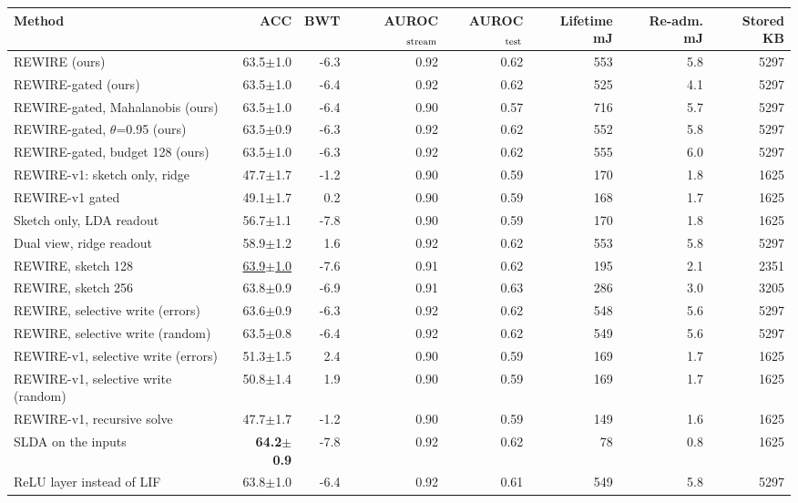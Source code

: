 \begin{tabular}{lrrrrrrr}
\toprule
Method & ACC & BWT & AUROC$_{\rm stream}$ & AUROC$_{\rm test}$ & Lifetime mJ & Re-adm. mJ & Stored KB \\
\midrule
REWIRE (ours) & 63.5{\tiny$\pm$1.0} & -6.3 & 0.92 & 0.62 & 553 & 5.8 & 5297 \\
REWIRE-gated (ours) & 63.5{\tiny$\pm$1.0} & -6.4 & 0.92 & 0.62 & 525 & 4.1 & 5297 \\
REWIRE-gated, Mahalanobis (ours) & 63.5{\tiny$\pm$1.0} & -6.4 & 0.90 & 0.57 & 716 & 5.7 & 5297 \\
REWIRE-gated, $\theta$=0.95 (ours) & 63.5{\tiny$\pm$0.9} & -6.3 & 0.92 & 0.62 & 552 & 5.8 & 5297 \\
REWIRE-gated, budget 128 (ours) & 63.5{\tiny$\pm$1.0} & -6.3 & 0.92 & 0.62 & 555 & 6.0 & 5297 \\
REWIRE-v1: sketch only, ridge & 47.7{\tiny$\pm$1.7} & -1.2 & 0.90 & 0.59 & 170 & 1.8 & 1625 \\
REWIRE-v1 gated & 49.1{\tiny$\pm$1.7} & 0.2 & 0.90 & 0.59 & 168 & 1.7 & 1625 \\
Sketch only, LDA readout & 56.7{\tiny$\pm$1.1} & -7.8 & 0.90 & 0.59 & 170 & 1.8 & 1625 \\
Dual view, ridge readout & 58.9{\tiny$\pm$1.2} & 1.6 & 0.92 & 0.62 & 553 & 5.8 & 5297 \\
REWIRE, sketch 128 & \underline{63.9{\tiny$\pm$1.0}} & -7.6 & 0.91 & 0.62 & 195 & 2.1 & 2351 \\
REWIRE, sketch 256 & 63.8{\tiny$\pm$0.9} & -6.9 & 0.91 & 0.63 & 286 & 3.0 & 3205 \\
REWIRE, selective write (errors) & 63.6{\tiny$\pm$0.9} & -6.3 & 0.92 & 0.62 & 548 & 5.6 & 5297 \\
REWIRE, selective write (random) & 63.5{\tiny$\pm$0.8} & -6.4 & 0.92 & 0.62 & 549 & 5.6 & 5297 \\
REWIRE-v1, selective write (errors) & 51.3{\tiny$\pm$1.5} & 2.4 & 0.90 & 0.59 & 169 & 1.7 & 1625 \\
REWIRE-v1, selective write (random) & 50.8{\tiny$\pm$1.4} & 1.9 & 0.90 & 0.59 & 169 & 1.7 & 1625 \\
REWIRE-v1, recursive solve & 47.7{\tiny$\pm$1.7} & -1.2 & 0.90 & 0.59 & 149 & 1.6 & 1625 \\
SLDA on the inputs & \textbf{64.2{\tiny$\pm$0.9}} & -7.8 & 0.92 & 0.62 & 78 & 0.8 & 1625 \\
ReLU layer instead of LIF & 63.8{\tiny$\pm$1.0} & -6.4 & 0.92 & 0.61 & 549 & 5.8 & 5297 \\

\end{tabular}

